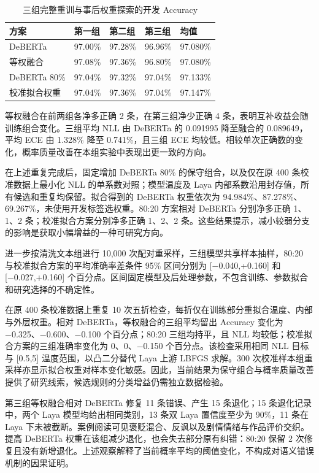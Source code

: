 \documentclass[UTF8,fontset=fandol,a4paper,11pt]{ctexart}
\begin{document}
\begin{table}[htbp]\centering\caption{三组完整重训与事后权重探索的开发 Accuracy}\label{tab:t7}\small\renewcommand{\arraystretch}{1.25}
\begin{tabularx}{\linewidth}{YYYYY}\toprule
\textbf{方案} & \textbf{第一组} & \textbf{第二组} & \textbf{第三组} & \textbf{均值}\\\midrule
DeBERTa & 97.00\% & 97.28\% & 96.96\% & 97.080\%\\
等权融合 & 97.08\% & 97.36\% & 96.80\% & 97.080\%\\
DeBERTa 80\% & 97.04\% & 97.32\% & 97.04\% & 97.133\%\\
校准拟合权重 & 97.04\% & 97.36\% & 97.04\% & 97.147\%\\
\bottomrule\end{tabularx}\end{table}
等权融合在前两组各净多正确 2 条，在第三组净少正确 4 条，表明互补收益会随训练组合变化。三组平均 NLL 由 DeBERTa 的 0.091995 降至融合的 0.089649，平均 ECE 由 1.328\% 降至 0.741\%，且三组 ECE 均较低。相较单次正确数的变化，概率质量改善在本组实验中表现出更一致的方向。

在上述重复完成后，固定增加 DeBERTa 80\% 的保守组合，以及仅在原 400 条校准数据上最小化 NLL 的单系数对照；模型温度及 Laya 内部系数沿用封存值，所有候选和重复均保留。拟合得到的 DeBERTa 权重依次为 94.984\%、87.278\%、69.267\%，未使用开发标签选权重。80:20 方案相对 DeBERTa 分别净多正确 1、1、2 条；校准拟合方案分别净多正确 1、2、2 条。这些结果提示，减小较弱分支的影响是获取小幅增益的一种可研究方向。

进一步按清洗文本组进行 10,000 次配对重采样，三组模型共享样本抽样，80:20 与校准拟合方案的平均准确率差条件 95\% 区间分别为 [−0.040,+0.160] 和 [−0.027,+0.160] 个百分点。区间固定模型及后处理参数，不包含训练、参数拟合和研究选择的不确定性。

在原 400 条校准数据上重复 10 次五折检查，每折仅在训练部分重拟合温度、内部与外层权重。相对 DeBERTa，等权融合的三组平均留出 Accuracy 变化为 −0.325、−0.600、−0.100 个百分点；80:20 三组均持平，且 NLL 均较低；校准拟合方案的三组准确率变化为 0、0、−0.150 个百分点。该检查采用相同 NLL 目标与 [0.5,5] 温度范围，以凸二分替代 Laya 上游 LBFGS 求解。300 次校准样本组重采样亦显示拟合权重对样本变化敏感。因此，当前结果为保守组合与概率质量改善提供了研究线索，候选规则的分类增益仍需独立数据检验。

第三组等权融合相对 DeBERTa 修复 11 条错误、产生 15 条退化；15 条退化记录中，两个 Laya 模型均给出相同类别，13 条双 Laya 置信度至少为 90\%，11 条在 Laya 下未被截断。案例阅读可见褒贬混合、反讽以及剧情情绪与作品评价交织。提高 DeBERTa 权重在该组减少退化，也会失去部分原有纠错：80:20 保留 2 次修复且没有新增退化。上述观察解释了当前概率平均的阈值变化，不构成对语义错误机制的因果证明。
\end{document}
